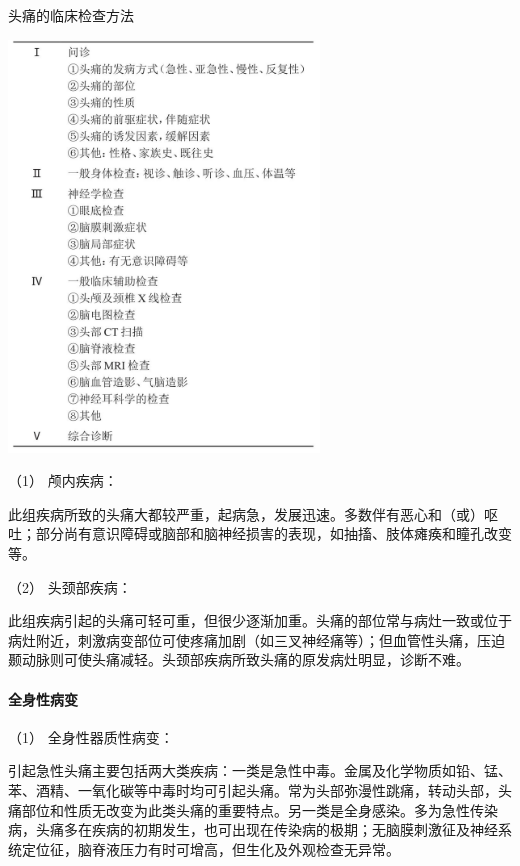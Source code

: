 \begin{table}[htbp]
\centering
\caption{头痛的临床检查方法}
\label{tab7-3}
\includegraphics[width=3.25in,height=4.30208in]{./images/Image00041.jpg}
\end{table}

\hypertarget{text00020.htmlux5cux23CHP1-7-2-2-1-1}{}
（1） 颅内疾病：

此组疾病所致的头痛大都较严重，起病急，发展迅速。多数伴有恶心和（或）呕吐；部分尚有意识障碍或脑部和脑神经损害的表现，如抽搐、肢体瘫痪和瞳孔改变等。

\hypertarget{text00020.htmlux5cux23CHP1-7-2-2-1-2}{}
（2） 头颈部疾病：

此组疾病引起的头痛可轻可重，但很少逐渐加重。头痛的部位常与病灶一致或位于病灶附近，刺激病变部位可使疼痛加剧（如三叉神经痛等）；但血管性头痛，压迫颞动脉则可使头痛减轻。头颈部疾病所致头痛的原发病灶明显，诊断不难。

\paragraph{全身性病变}

\hypertarget{text00020.htmlux5cux23CHP1-7-2-2-2-1}{}
（1） 全身性器质性病变：

引起急性头痛主要包括两大类疾病：一类是急性中毒。金属及化学物质如铅、锰、苯、酒精、一氧化碳等中毒时均可引起头痛。常为头部弥漫性跳痛，转动头部，头痛部位和性质无改变为此类头痛的重要特点。另一类是全身感染。多为急性传染病，头痛多在疾病的初期发生，也可出现在传染病的极期；无脑膜刺激征及神经系统定位征，脑脊液压力有时可增高，但生化及外观检查无异常。

